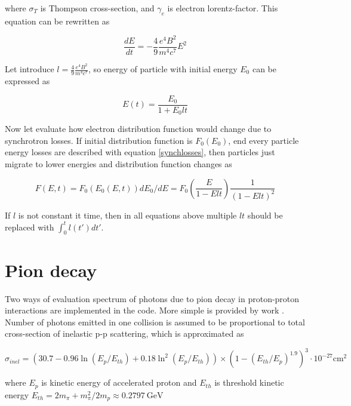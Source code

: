 where $\sigma_T$ is Thompson cross-section, and $\gamma_e$ is electron lorentz-factor. This equation can be rewritten as

\begin{equation} \label{synchlosses}
	\frac{dE}{dt} = - \frac{4}{9} \frac{e^4 B^2}{m^4 c^7} E^2
\end{equation}

Let introduce $l = \frac{4}{9} \frac{e^4 B^2}{m^4 c^7}$, so energy of particle with initial energy $E_0$ can be expressed as

\begin{equation}
	E(t) = \frac{E_0}{1 + E_0 l t}
\end{equation}

Now let evaluate how electron distribution function would change due to synchrotron losses. If initial distribution function is $F_0(E_0)$, end every particle energy losses are described with equation \ref{synchlosses}, then particles just migrate to lower energies and distribution function changes as

\begin{equation}
	F(E,t) = F_0\left(E_0(E,t)\right) dE_0/dE = F_0\left(\frac{E}{1-E l t}\right)\frac{1}{\left(1 - E l t\right)^2}
\end{equation}

If $l$ is not constant it time, then in all equations above multiple $l t$ should be replaced with $\int_0^t l(t')dt'$.

\section{Pion decay}

Two ways of evaluation spectrum of photons due to pion decay in proton-proton interactions are implemented in the code. More simple is provided by work \cite{Kelner}. Number of photons emitted in one collision is assumed to be proportional to total cross-section of inelastic p-p scattering, which is approximated as \cite{Kafexhiu}

\begin{equation}\label{sigmainel}
	\sigma_{inel} = \left(30.7 - 0.96\ln\left(E_p/E_{th}\right) + 0.18\ln^2\left(E_p/E_{th}\right) \right)\times\left(1 - \left(E_{th}/E_p\right)^{1.9}\right)^3\cdot10^{-27} \text{cm}^{2}
\end{equation}

where $E_p$ is kinetic energy of accelerated proton and $E_{th}$ is threshold kinetic energy $E_{th} = 2m_{\pi}+m^2_{\pi}/2m_p \approx 0.2797~\text{GeV}$

